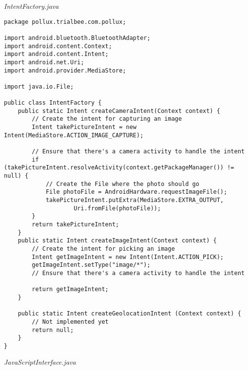 \emph{IntentFactory.java}
\begin{lstlisting}
package pollux.trialbee.com.pollux;

import android.bluetooth.BluetoothAdapter;
import android.content.Context;
import android.content.Intent;
import android.net.Uri;
import android.provider.MediaStore;

import java.io.File;

public class IntentFactory {
    public static Intent createCameraIntent(Context context) {
        // Create the intent for capturing an image
        Intent takePictureIntent = new Intent(MediaStore.ACTION_IMAGE_CAPTURE);

        // Ensure that there's a camera activity to handle the intent
        if (takePictureIntent.resolveActivity(context.getPackageManager()) != null) {
            // Create the File where the photo should go
            File photoFile = AndroidHardware.requestImageFile();
            takePictureIntent.putExtra(MediaStore.EXTRA_OUTPUT,
                    Uri.fromFile(photoFile));
        }
        return takePictureIntent;
    }
    public static Intent createImageIntent(Context context) {
        // Create the intent for picking an image
        Intent getImageIntent = new Intent(Intent.ACTION_PICK);
        getImageIntent.setType("image/*");
        // Ensure that there's a camera activity to handle the intent

        return getImageIntent;
    }

    public static Intent createGeolocationIntent (Context context) {
        // Not implemented yet
        return null;
    }
}
\end{lstlisting}
\emph{JavaScriptInterface.java}
